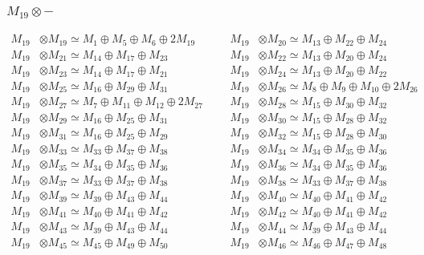 \subsubsection{$ M_{19}\otimes -$}
\begin{align*}
M_{19} &\otimes M_{19} \simeq M_{1} \oplus M_{5} \oplus M_{6} \oplus 2M_{19} &&& M_{19} &\otimes M_{20} \simeq M_{13} \oplus M_{22} \oplus M_{24}\\
M_{19} &\otimes M_{21} \simeq M_{14} \oplus M_{17} \oplus M_{23} &&& M_{19} &\otimes M_{22} \simeq M_{13} \oplus M_{20} \oplus M_{24}\\
M_{19} &\otimes M_{23} \simeq M_{14} \oplus M_{17} \oplus M_{21} &&& M_{19} &\otimes M_{24} \simeq M_{13} \oplus M_{20} \oplus M_{22}\\
M_{19} &\otimes M_{25} \simeq M_{16} \oplus M_{29} \oplus M_{31} &&& M_{19} &\otimes M_{26} \simeq M_{8} \oplus M_{9} \oplus M_{10} \oplus 2M_{26}\\
M_{19} &\otimes M_{27} \simeq M_{7} \oplus M_{11} \oplus M_{12} \oplus 2M_{27} &&& M_{19} &\otimes M_{28} \simeq M_{15} \oplus M_{30} \oplus M_{32}\\
M_{19} &\otimes M_{29} \simeq M_{16} \oplus M_{25} \oplus M_{31} &&& M_{19} &\otimes M_{30} \simeq M_{15} \oplus M_{28} \oplus M_{32}\\
M_{19} &\otimes M_{31} \simeq M_{16} \oplus M_{25} \oplus M_{29} &&& M_{19} &\otimes M_{32} \simeq M_{15} \oplus M_{28} \oplus M_{30}\\
M_{19} &\otimes M_{33} \simeq M_{33} \oplus M_{37} \oplus M_{38} &&& M_{19} &\otimes M_{34} \simeq M_{34} \oplus M_{35} \oplus M_{36}\\
M_{19} &\otimes M_{35} \simeq M_{34} \oplus M_{35} \oplus M_{36} &&& M_{19} &\otimes M_{36} \simeq M_{34} \oplus M_{35} \oplus M_{36}\\
M_{19} &\otimes M_{37} \simeq M_{33} \oplus M_{37} \oplus M_{38} &&& M_{19} &\otimes M_{38} \simeq M_{33} \oplus M_{37} \oplus M_{38}\\
M_{19} &\otimes M_{39} \simeq M_{39} \oplus M_{43} \oplus M_{44} &&& M_{19} &\otimes M_{40} \simeq M_{40} \oplus M_{41} \oplus M_{42}\\
M_{19} &\otimes M_{41} \simeq M_{40} \oplus M_{41} \oplus M_{42} &&& M_{19} &\otimes M_{42} \simeq M_{40} \oplus M_{41} \oplus M_{42}\\
M_{19} &\otimes M_{43} \simeq M_{39} \oplus M_{43} \oplus M_{44} &&& M_{19} &\otimes M_{44} \simeq M_{39} \oplus M_{43} \oplus M_{44}\\
M_{19} &\otimes M_{45} \simeq M_{45} \oplus M_{49} \oplus M_{50} &&& M_{19} &\otimes M_{46} \simeq M_{46} \oplus M_{47} \oplus M_{48}\\

\end{align*}
